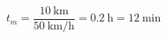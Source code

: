 \documentclass[preview]{standalone}
\begin{document}
\[
t_m = \frac{10 \ \text{km}}{50 \ \text{km/h}} = 0.2 \ \text{h} = 12 \ \text{min}
\]
\end{document}
